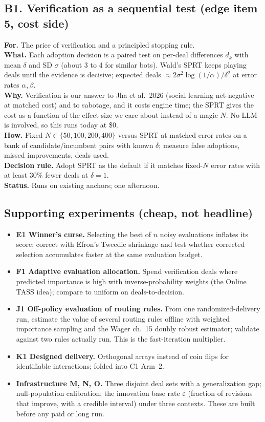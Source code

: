 \documentclass[11pt]{article}
\begin{document}
\subsection{B1. Verification as a sequential test (edge item 5, cost side)}
\textbf{For.} The price of verification and a principled stopping rule.\\
\textbf{What.} Each adoption decision is a paired test on per-deal differences $d_k$ with mean $\delta$ and SD
$\sigma$ (about 3 to 4 for similar bots). Wald's SPRT keeps playing deals until the evidence is decisive; expected
deals $\approx 2\sigma^2\log(1/\alpha)/\delta^2$ at error rates $\alpha,\beta$.\\
\textbf{Why.} Verification is our answer to Jha et al.\ 2026 (social learning net-negative at matched cost) and to
sabotage, and it costs engine time; the SPRT gives the cost as a function of the effect size we care about instead of
a magic $N$. No LLM is involved, so this runs today at \$0.\\
\textbf{How.} Fixed $N\in\{50,100,200,400\}$ versus SPRT at matched error rates on a bank of candidate/incumbent
pairs with known $\delta$; measure false adoptions, missed improvements, deals used.\\
\textbf{Decision rule.} Adopt SPRT as the default if it matches fixed-$N$ error rates with at least $30\%$ fewer
deals at $\delta=1$.\\
\textbf{Status.} Runs on existing anchors; one afternoon.

\subsection{Supporting experiments (cheap, not headline)}
\begin{itemize}
\item \textbf{E1 Winner's curse.} Selecting the best of $n$ noisy evaluations inflates its score; correct with
Efron's Tweedie shrinkage and test whether corrected selection accumulates faster at the same evaluation budget.
\item \textbf{F1 Adaptive evaluation allocation.} Spend verification deals where predicted importance is high with
inverse-probability weights (the Online TASS idea); compare to uniform on deals-to-decision.
\item \textbf{J1 Off-policy evaluation of routing rules.} From one randomized-delivery run, estimate the value of
several routing rules offline with weighted importance sampling and the Wager ch.~15 doubly robust estimator; validate
against two rules actually run. This is the fast-iteration multiplier.
\item \textbf{K1 Designed delivery.} Orthogonal arrays instead of coin flips for identifiable interactions; folded
into C1 Arm~2.
\item \textbf{Infrastructure M, N, O.} Three disjoint deal sets with a generalization gap; null-population
calibration; the innovation base rate $\varepsilon$ (fraction of revisions that improve, with a credible interval)
under three contexts. These are built before any paid or long run.
\end{itemize}
\end{document}
